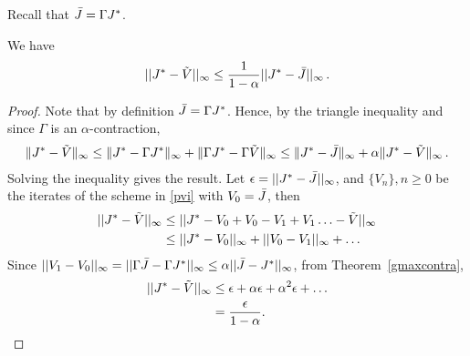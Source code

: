 Recall that $\bar{J} = \Gamma J^*$.
\begin{theorem}\label{fxpres}
We have 
\begin{align}
||J^*-\tilde{V}||_\infty\leq \frac{1}{1-\alpha}||J^*-\bar{J}||_\infty\,.
\end{align}
\end{theorem}
\begin{proof}
Note that by definition $\bar{J} = \Gamma J^*$.
Hence, by the triangle inequality and since $\Gamma$ is an $\alpha$-contraction,
\begin{align*}
\|J^* - \tilde{V} \|_{\infty} \le \| J^* - \Gamma J^* \|_{\infty} + \|\Gamma J^* - \Gamma \tilde{V} \|_{\infty}
\le  \| J^* - \bar{J} \|_{\infty} + \alpha \|J^* - \tilde{V}\|_{\infty}\,.
\end{align*}
Solving the inequality gives the result.
Let $\epsilon=||J^*-\bar{J}||_\infty$, and $\{V_n\},n\geq 0$ be the iterates of the scheme in \eqref{pvi} with $V_0=\bar{J}$, then
\begin{align}
||J^*-\tilde{V}||_\infty&\leq ||J^*-V_0+V_0-V_1+V_1\ldots-\tilde{V}||_\infty\nonumber\\
&\leq ||J^*-V_0||_\infty+||V_0-V_1||_\infty+\ldots\nonumber
\end{align}
Since $||V_1-V_0||_\infty=||\Gamma \bar{J}-\Gamma J^*||_\infty\leq\alpha||\bar{J}-J^*||_\infty$, from Theorem~\ref{gmaxcontra},
\begin{align}
||J^*-\tilde{V}||_\infty&\leq \epsilon+\alpha\epsilon+\alpha^2\epsilon+\ldots\nonumber\\
&=\frac{\epsilon}{1-\alpha}.
\end{align}
\fi
\end{proof}
